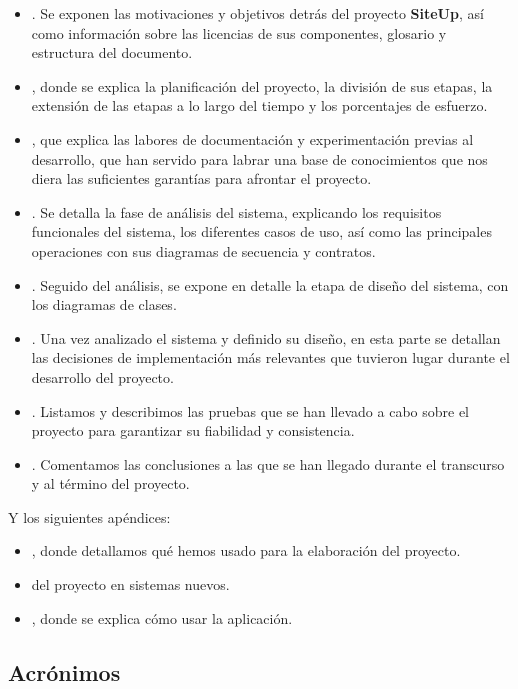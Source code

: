 \begin{itemize}
\item \textbf{}. Se exponen las motivaciones y
  objetivos detrás del proyecto \textbf{SiteUp}, así como información sobre las
  licencias de sus componentes, glosario y estructura del documento.
\item \textbf{}, donde se explica la planificación del
  proyecto, la división de sus etapas, la extensión de las etapas a lo largo del
  tiempo y los porcentajes de esfuerzo.
\item \textbf{}, que explica las labores de
  documentación y experimentación previas al desarrollo, que han servido para
  labrar una base de conocimientos que nos diera las suficientes garantías para
  afrontar el proyecto.
\item \textbf{}. Se detalla la fase de análisis del
  sistema, explicando los requisitos funcionales del sistema, los diferentes
  casos de uso, así como las principales operaciones con sus diagramas de
  secuencia y contratos.
\item \textbf{}. Seguido del análisis, se expone en detalle
  la etapa de diseño del sistema, con los diagramas de clases.
\item \textbf{}. Una vez analizado el sistema y
  definido su diseño, en esta parte se detallan las decisiones de implementación
  más relevantes que tuvieron lugar durante el desarrollo del proyecto.
\item \textbf{}. Listamos y describimos las pruebas que se
  han llevado a cabo sobre el proyecto para garantizar su fiabilidad y
  consistencia.
\item \textbf{}. Comentamos las conclusiones a las
  que se han llegado durante el transcurso y al término del proyecto.
\end{itemize}

Y los siguientes apéndices:
\begin{itemize}
\item \textbf{}, donde detallamos qué hemos usado para la
  elaboración del proyecto.
\item \textbf{} del proyecto en sistemas nuevos.
\item \textbf{}, donde se explica cómo usar la aplicación.
\end{itemize}

\subsection{Acrónimos}




